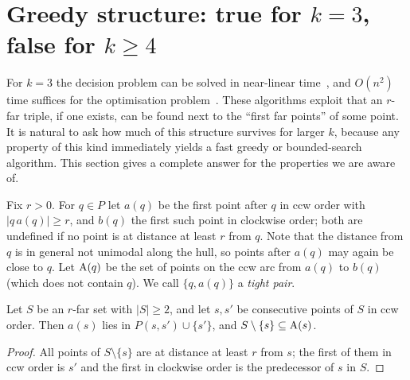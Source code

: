 \chapter{Greedy structure: true for \texorpdfstring{$k=3$}{k=3}, false for \texorpdfstring{$k\ge4$}{k>=4}}\label{sec:greedy}

For $k=3$ the decision problem can be solved in near-linear
time~\citep{tw25}, and $O(n^2)$ time suffices for the optimisation
problem~\citep{kobayashi}. These algorithms exploit that an $r$-far triple, if
one exists, can be found next to the ``first far points'' of some point. It is
natural to ask how much of this structure survives for larger $k$, because any
property of this kind immediately yields a fast greedy or bounded-search
algorithm. This section gives a complete answer for the properties we are
aware of.

Fix $r>0$. For $q\in P$ let $a(q)$ be the first point after $q$ in ccw order
with $|q\,a(q)|\ge r$, and $b(q)$ the first such point in clockwise order;
both are undefined if no point is at distance at least $r$ from $q$. Note that
the distance from $q$ is in general not unimodal along the hull, so points
after $a(q)$ may again be close to $q$. Let $\mathrm{A}(q)$ be the set of points on
the ccw arc from $a(q)$ to $b(q)$ (which does not contain $q$). We call
$\{q,a(q)\}$ a \emph{tight pair}.

\begin{lemma}\label{lem:arcbasic}
Let $S$ be an $r$-far set with $|S|\ge2$, and let $s,s'$ be consecutive points
of $S$ in ccw order. Then $a(s)$ lies in $P(s,s')\cup\{s'\}$, and
$S\setminus\{s\}\subseteq\mathrm{A}(s)$.
\end{lemma}
\begin{proof}
All points of $S\setminus\{s\}$ are at distance at least $r$ from $s$; the first
of them in ccw order is $s'$ and the first in clockwise order is the
predecessor of $s$ in $S$.
\end{proof}

